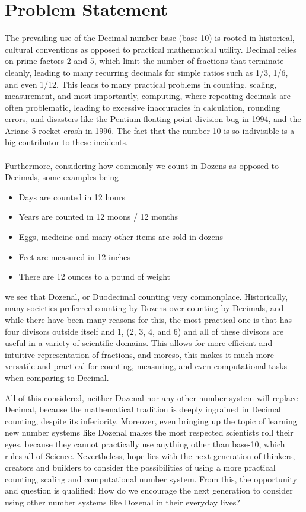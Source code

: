 \documentclass{article}
\begin{document}
    \section{Problem Statement}
    The prevailing use of the Decimal number base (base-10) is rooted in historical,
    cultural conventions as opposed to practical mathematical utility. Decimal relies on prime
    factors 2 and 5, which limit the number of fractions that terminate cleanly, 
    leading to many recurring decimals for simple ratios such as 1/3, 1/6, and even 1/12. 
    This leads to many practical problems in counting, scaling, measurement, and most importantly,
    computing, where repeating decimals are often problematic, leading to excessive inaccuracies
    in calculation, rounding errors, and disasters like the Pentium floating-point division bug in 1994,
    and the Ariane 5 rocket crash in 1996. The fact that the number 10 is so indivisible is a big
    contributor to these incidents. \\
    \\
    Furthermore, considering how commonly we count in Dozens as opposed to Decimals, some examples being
    \begin{itemize}
    \item Days are counted in 12 hours
    \item Years are counted in 12 moons / 12 months
    \item Eggs, medicine and many other items are sold in dozens
    \item Feet are measured in 12 inches
    \item There are 12 ounces to a pound of weight \\
    \end{itemize}
    we see that Dozenal, or Duodecimal counting very commonplace. Historically, many societies preferred counting by Dozens
    over counting by Decimals, and while there have been many reasons for this, the most practical one is that has four divisors
    outside itself and 1, (2, 3, 4, and 6) and all of these divisors are useful in a variety of scientific domains. 
    This allows for more efficient and intuitive representation of fractions,
    and moreso, this makes it much more versatile and practical for counting, measuring, and even
    computational tasks when comparing to Decimal.

    All of this considered, neither Dozenal nor any other number system will replace Decimal, because the mathematical
    tradition is deeply ingrained in Decimal counting, despite its inferiority. Moreover, even bringing up the
    topic of learning new number systems like Dozenal makes the most respected scientists roll their eyes,
    because they cannot practically use anything other than base-10, which rules all of Science.
    Nevertheless, hope lies with the next generation of thinkers, creators and builders to consider the
    possibilities of using a more practical counting, scaling and computational number system. From this, the
    opportunity and question is qualified: How do we encourage the next generation to consider using other number
    systems like Dozenal in their everyday lives?
\end{document}
